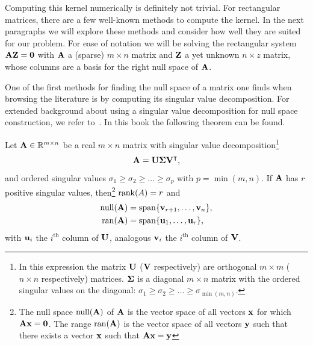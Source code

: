 Computing this kernel numerically is definitely not trivial. For rectangular matrices, there are a few well-known methods to compute the kernel. In the next paragraphs we will explore these methods and consider how well they are suited for our problem. For ease of notation we will be solving the rectangular system $\vb{A} \vb{Z} = \vb{0}$ with $\vb{A}$ a (sparse) $m\times n$ matrix and $\vb{Z}$ a yet unknown $n \times z$ matrix, whose columns are a basis for the right null space of $\vb{A}$.

One of the first methods for finding the null space of a matrix one finds when browsing the literature is by computing its singular value decomposition. For extended background about using a singular value decomposition for null space construction, we refer to~\cite[section~2.4]{golub_matrix_2013}. In this book the following theorem can be found.

\begin{theorem}
    Let $\vb{A} \in \mathbb{R}^{m \times n}$ be a real $m \times n$ matrix with singular value decomposition\footnote{In this expression the matrix $\vb{U}$ ($\vb{V}$ respectively) are orthogonal $m \times m$ ($n \times n$ respectively) matrices. $\vb{\Sigma}$ is a diagonal $m \times n$ matrix with the ordered singular values on the diagonal: $\sigma_1 \geq \sigma_2 \geq \dots \geq \sigma_{\min(m, n)}$. }
    $$
        \vb{A} = \vb{U}\vb{\Sigma}{\vb{V}}^\intercal\text{,}
    $$
    and ordered singular values $\sigma_1 \geq \sigma_2 \geq \dots \geq \sigma_p$ with $p = \min(m, n)$.
    If $\vb{A}$ has $r$ positive singular values, then\footnote{The null space $\operatorname{null}(\vb{A})$ of $\vb{A}$ is the vector space of all vectors $\vb{x}$ for which $\vb{A} \vb{x} = \vb{0}$. The range $\operatorname{ran}(\vb{A})$ is the vector space of all vectors $\vb{y}$ such that there exists a vector $\vb{x}$ such that $\vb{A}\vb{x} = \vb{y}$} $\operatorname{rank}(A) = r$ and
    \begin{align*}
        \operatorname{null}(\vb{A}) & = \operatorname{span}\{\vb{v}_{r+1}, \dots, \vb{v}_{n}\}\text{,} \\
        \operatorname{ran}(\vb{A})  & = \operatorname{span}\{\vb{u}_{1}, \dots, \vb{u}_{r}\}\text{,}
    \end{align*}
    with $\vb{u}_i$ the $i^\text{th}$ column of $\vb{U}$, analogous $\vb{v}_i$ the $i^\text{th}$ column of $\vb{V}$.
\end{theorem}

